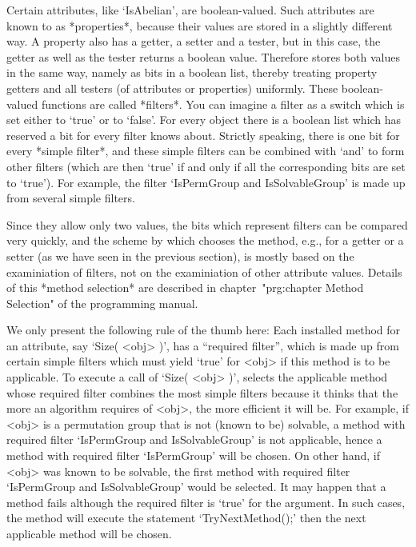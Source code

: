 \null

%
%
Certain attributes, like `IsAbelian', are boolean-valued. Such attributes
are known to {\GAP} as *properties*, because their values are stored in a
slightly different way.   A property also  has a  getter, a  setter and a
tester, but  in this case,  the  getter as well  as the  tester returns a
boolean value. Therefore {\GAP}  stores   both values  in the same   way,
namely as bits  in a boolean  list, thereby treating property getters and
all testers (of attributes or properties) uniformly. These boolean-valued
functions  are called  *filters*.  You can imagine  a filter  as a switch
which is  set either  to `true' or  to `false'.  For every  {\GAP} object
there is a boolean list which has reserved a  bit for every filter {\GAP}
knows  about. Strictly speaking, there   is one bit for every  *simple
filter*, and these  simple filters can be  combined with `and' to form
other filters (which are then `true' if and only if all the corresponding
bits are set to `true').
For example, the filter `IsPermGroup and IsSolvableGroup' is made up from
several simple filters.

Since they allow only two values, the bits which represent filters can be
compared very quickly, and the scheme by which {\GAP} chooses the method,
e.g., for a getter or a setter (as we have seen in the previous section),
is mostly based  on the examiniation of filters,  not on the examiniation
of other  attribute   values. Details  of   this *method selection*   are
described  in chapter~"prg:chapter  Method  Selection" of the programming
manual.

We  only present the following  rule  of the  thumb here: Each  installed
method for an attribute, say `Size(  <obj> )', has a ``required filter'',
which is made  up from certain simple filters  which must yield `true'
for <obj> if this method is to be applicable. To execute a call of `Size(
<obj>   )', {\GAP} selects  the  applicable  method whose required filter
combines the most  simple filters because  it thinks that the more  an
algorithm requires of <obj>, the more efficient  it will be. For example,
if <obj>  is a permutation group  that is not  (known to be)  solvable, a
method  with required filter   `IsPermGroup  and IsSolvableGroup'  is not
applicable,  hence a  method with  required  filter `IsPermGroup' will be
chosen. On  other  hand, if <obj>  was  known to be   solvable, the first
method with required filter  `IsPermGroup  and IsSolvableGroup' would  be
selected. It may happen that a  method fails although the required filter
is  `true' for the  argument. In such  cases, the method will execute the
statement  `TryNextMethod();' then the  next   applicable method will  be
chosen.

